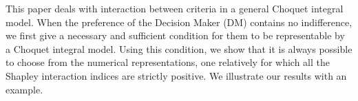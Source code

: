 
 This paper deals with interaction  between criteria in a
general Choquet integral model. When the preference of the Decision
Maker (DM) contains no indifference, we first give a necessary and
sufficient condition for them to be representable by a Choquet
integral model. Using this condition, we show that it is always
possible to choose from the numerical representations, one
relatively for which all the Shapley interaction indices are strictly
positive. We illustrate our results with an example.


